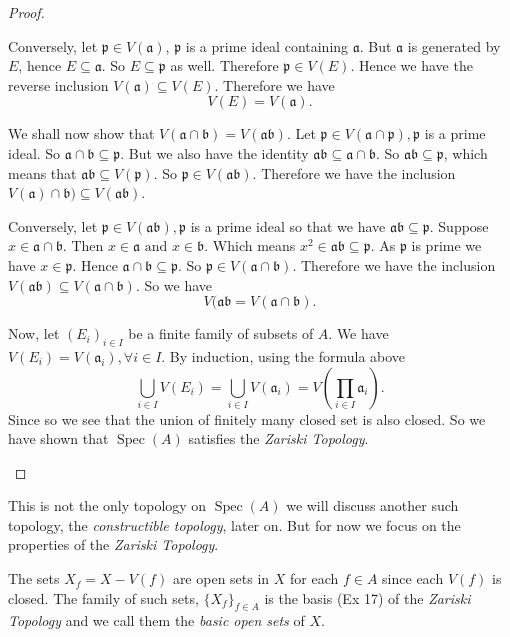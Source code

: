 \documentclass[]{report}
\DeclareMathOperator\Spec{Spec}
\begin{document}
\begin{proof}
\begin{enumerate}
        Conversely, let $\mathfrak{p} \in V(\mathfrak{a})$, $\mathfrak{p}$ is a prime ideal containing $\mathfrak{a}$. But $\mathfrak{a}$ is generated by $E$, hence $E \subseteq \mathfrak{a}$. So $E \subseteq \mathfrak{p}$ as well. Therefore $\mathfrak{p} \in V(E)$. Hence we have the reverse inclusion $V(\mathfrak{a}) \subseteq V(E)$. Therefore we have
        $$V(E) = V(\mathfrak{a}).$$

        We shall now show that $V(\mathfrak{a} \cap \mathfrak{b}) = V(\mathfrak{ab})$. Let $\mathfrak{p} \in V(\mathfrak{a} \cap \mathfrak{p}), \mathfrak{p}$ is a prime ideal. So $\mathfrak{a} \cap \mathfrak{b} \subseteq \mathfrak{p}$. But we also have the identity $\mathfrak{ab} \subseteq \mathfrak{a} \cap \mathfrak{b}$. So $\mathfrak{ab} \subseteq \mathfrak{p}$, which means that $\mathfrak{ab} \subseteq V(\mathfrak{p})$. So $\mathfrak{p} \in V(\mathfrak{ab})$. Therefore we have the inclusion $V(\mathfrak{a}) \cap \mathfrak{b}) \subseteq V(\mathfrak{ab})$.

        Conversely, let $\mathfrak{p} \in V(\mathfrak{ab}), \mathfrak{p}$ is a prime ideal so that we have $\mathfrak{ab} \subseteq \mathfrak{p}$. Suppose $x \in \mathfrak{a} \cap \mathfrak{b}$. Then $x \in \mathfrak{a} \text{ and } x \in \mathfrak{b}$. Which means $x^2 \in \mathfrak{ab} \subseteq \mathfrak{p}$. As $\mathfrak{p}$ is prime we have $x \in \mathfrak{p}$. Hence $\mathfrak{a} \cap \mathfrak{b} \subseteq \mathfrak{p}$. So $\mathfrak{p} \in V(\mathfrak{a} \cap \mathfrak{b})$. Therefore we have the inclusion $V(\mathfrak{ab}) \subseteq V(\mathfrak{a} \cap \mathfrak{b})$. So we have
        $$V(\mathfrak{ab} = V(\mathfrak{a} \cap \mathfrak{b}).$$


        Now, let $(E_i)_{i \in I}$ be a finite family of subsets of $A$. We have $V(E_i) = V(\mathfrak{a}_i), \forall i \in I$. By induction, using the formula above 
        $$\bigcup_{i \in I} V(E_i) = \bigcup_{i \in I} V(\mathfrak{a}_i) = V(\prod_{i \in I} \mathfrak{a}_i).$$
        Since so we see that the union of finitely many closed set is also closed. So we have shown that $\Spec(A)$ satisfies the \textit{Zariski Topology}.
\end{enumerate}
\end{proof}

    This is not the only topology on $\Spec(A)$ we will discuss another such topology, the \textit{constructible topology}, later on. But for now we focus on the properties of the \textit{Zariski Topology}.

    The sets $X_f = X - V(f)$ are open sets in $X$ for each $f\in A$ since each $V(f)$ is closed. The family of such sets, $\{X_f\}_{f\in A}$ is the basis (Ex 17) of the \textit{Zariski Topology} and we call them the \textit{basic open sets} of $X$.
\end{document}
